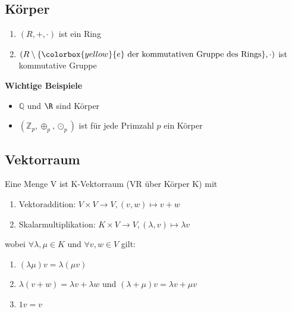 \documentclass[german, fourcolumn, 8pt]{latex4ei/latex4ei_sheet}
\begin{document}
\begin{sectionbox}
    \subsection{Körper}
    \begin{enumerate}
        \item $(R, +, \cdot)$ ist ein Ring
        \item $(R\setminus \{\colorbox{yellow}{e}\text{ der kommutativen Gruppe des Rings}\}, \cdot)$ ist kommutative Gruppe
    \end{enumerate}

    \textbf{Wichtige Beispiele}
    \begin{itemize}
        \item $\mathbb{Q}$ und $\R$ sind Körper
        \item $(\mathbb{Z}_p, \oplus_p, \odot_p)$ ist für jede Primzahl $p$ ein Körper
    \end{itemize}
\end{sectionbox}

\begin{sectionbox}
    \subsection{Vektorraum}
    Eine Menge V ist K-Vektorraum (VR über Körper K) mit
    \begin{enumerate}
        \item Vektoraddition: $V \times V\rightarrow V, (v,w) \mapsto v + w$
        \item Skalarmultiplikation: $K\times V \rightarrow V, (\lambda, v)\mapsto \lambda v$
    \end{enumerate}
    wobei $\forall \lambda, \mu \in K$ und $\forall v,w \in V$ gilt:
    \begin{enumerate}
        \item $(\lambda \mu)v=\lambda(\mu v)$
        \item $\lambda(v+w)=\lambda v + \lambda w$ und $(\lambda + \mu)v=\lambda v + \mu v$
        \item $1v = v$
    \end{enumerate}
\end{sectionbox}
\end{document}
